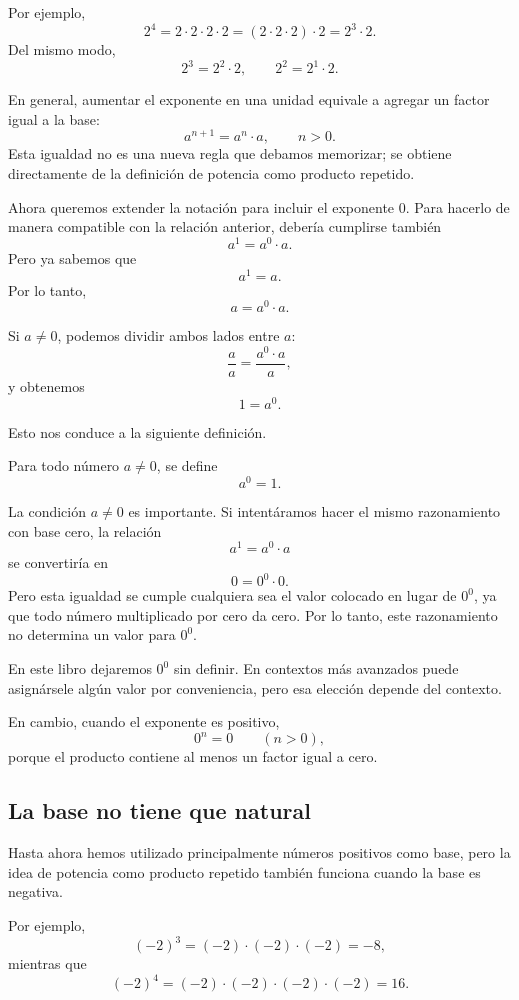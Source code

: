 Por ejemplo,
\[
2^4
=2\cdot2\cdot2\cdot2
=(2\cdot2\cdot2)\cdot2
=2^3\cdot2.
\]
Del mismo modo,
\[
2^3=2^2\cdot2,
\qquad
2^2=2^1\cdot2.
\]

En general, aumentar el exponente en una unidad equivale a agregar un factor igual a la base:
\[
a^{n+1}=a^n\cdot a,
\qquad n>0.
\]
Esta igualdad no es una nueva regla que debamos memorizar; se obtiene directamente de la definición de potencia como producto repetido.

Ahora queremos extender la notación para incluir el exponente \(0\). Para hacerlo de manera compatible con la relación anterior, debería cumplirse también
\[
a^1=a^0\cdot a.
\]
Pero ya sabemos que
\[
a^1=a.
\]
Por lo tanto,
\[
a=a^0\cdot a.
\]

Si \(a\ne0\), podemos dividir ambos lados entre \(a\):
\[
\frac{a}{a}
=
\frac{a^0\cdot a}{a},
\]
y obtenemos
\[
1=a^0.
\]

Esto nos conduce a la siguiente definición.

\begin{definitionbox}
Para todo número \(a\ne0\), se define
\[
a^0=1.
\]
\end{definitionbox}

La condición \(a\ne0\) es importante. Si intentáramos hacer el mismo razonamiento con base cero, la relación
\[
a^1=a^0\cdot a
\]
se convertiría en
\[
0=0^0\cdot0.
\]
Pero esta igualdad se cumple cualquiera sea el valor colocado en lugar de \(0^0\), ya que todo número multiplicado por cero da cero. Por lo tanto, este razonamiento no determina un valor para \(0^0\).

En este libro dejaremos \(0^0\) sin definir. En contextos más avanzados puede asignársele algún valor por conveniencia, pero esa elección depende del contexto.

En cambio, cuando el exponente es positivo,
\[
0^n=0
\qquad(n>0),
\]
porque el producto contiene al menos un factor igual a cero.

\subsection{La base no tiene que natural}

Hasta ahora hemos utilizado principalmente números positivos como base, pero la idea de potencia como producto repetido también funciona cuando la base es negativa.

Por ejemplo,
\[
(-2)^3=(-2)\cdot(-2)\cdot(-2)=-8,
\]
mientras que
\[
(-2)^4=(-2)\cdot(-2)\cdot(-2)\cdot(-2)=16.
\]

